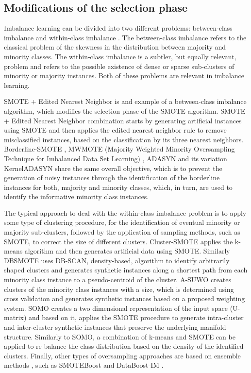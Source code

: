 \documentclass[parskip=full]{scrartcl}
\begin{document}
\subsection{Modifications of the selection phase}

Imbalance learning can be divided into two different problems: between-class
imbalance and within-class imbalance \cite{Jo2004}. The between-class imbalance
refers to the classical problem of the skewness in the distribution between
majority and minority classes. The within-class imbalance is a subtler, but
equally relevant, problem and refers to the possible existence of dense or
sparse sub-clusters of minority or majority instances. Both of these problems
are relevant in imbalance learning. 

SMOTE + Edited Nearest Neighbor \cite{Batista2004} is and example of a
between-class imbalance algorithm, which modifies the selection phase of the
SMOTE algorithm. SMOTE + Edited Nearest Neighbor combination starts by
generating artificial instances using SMOTE and then applies the edited nearest
neighbor rule \cite{Wilson1972} to remove misclassified instances, based on the
classification by its three nearest neighbors. Borderline-SMOTE \cite{Han2005},
MWMOTE (Majority Weighted Minority Oversampling Technique for Imbalanced Data
Set Learning) \cite{Barua2014}, ADASYN and its variation KernelADASYN
\cite{Tang2015} share the same overall objective, which is to prevent the
generation of noisy instances through the identification of the borderline
instances for both, majority and minority classes, which, in turn, are used to
identify the informative minority class instances. 

The typical approach to deal with the within-class imbalance  problem is to
apply some type of clustering procedure, for the identification of eventual
minority or majority sub-clusters, followed by the application of sampling
methods, such as SMOTE, to correct the size of different clusters. Cluster-SMOTE
\cite{Cieslak2006} applies the k-means algorithm and then generates artificial
data using SMOTE. Similarly DBSMOTE \cite{Bunkhumpornpat2012} uses DB-SCAN,
density-based, algorithm to identify arbitrarily shaped clusters and generates
synthetic instances along a shortest path from each minority class instance to a
pseudo-centroid of the cluster. A-SUWO \cite{Nekooeimehr2016} creates clusters
of the minority class instances with a size, which is determined using cross
validation and generates synthetic instances based on a proposed weighting
system. SOMO \cite{Douzas2017a} creates a two dimensional representation of the
input space (U-matrix) and based on it, applies the SMOTE procedure to generate
intra-cluster and inter-cluster synthetic instances that preserve the underlying
manifold structure. Similarly to SOMO, a combination of k-means and SMOTE
\cite{Douzas2018} can be applied to re-balance the class distribution based on
the density of the identified clusters. Finally, other types of oversampling
approaches are based on ensemble methods  \cite{Wang2015}, \cite{Sun2015} such
as SMOTEBoost \cite{Chawla2003} and DataBoost-IM \cite{Guo2004}. 
\end{document}

